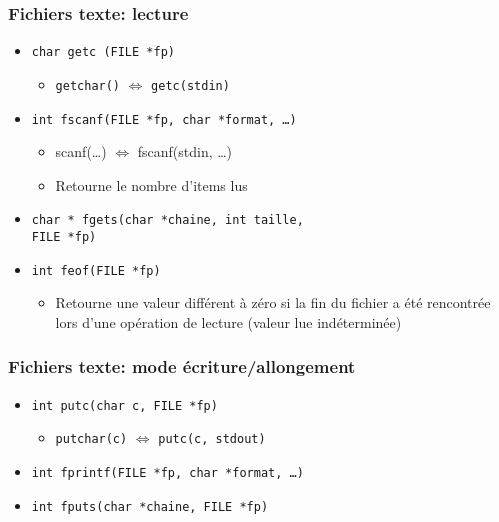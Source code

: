 \documentclass[table,handout,tikz,12pt,svgnames]{beamer}
\begin{document}
\begin{frame}[fragile=singleslide]
	\frametitle{Fichiers texte: lecture}
	\begin{block}{}
		\begin{itemize}

			\item \texttt{char getc (FILE *fp)}
			\begin{itemize}
				\item \texttt{getchar()} $\Leftrightarrow$ \texttt{getc(stdin)}
			\end{itemize}

			\item \texttt{int fscanf(FILE *fp, char *format, \ldots)}
			\begin{itemize}
				\item scanf(\ldots) $\Leftrightarrow$ fscanf(stdin, \ldots)
				\item Retourne le nombre d'items lus
			\end{itemize}
			
			\item \texttt{char * fgets(char *chaine, int taille,} \\
			\hspace{7em} \texttt{FILE *fp)}
			\item \texttt{int feof(FILE *fp)}
			\begin{itemize}
				\item Retourne une valeur différent à zéro si la fin du fichier a été rencontrée lors d'une opération de lecture (valeur lue indéterminée)
			\end{itemize}
			
		\end{itemize}
	\end{block}
\end{frame}


\begin{frame}[fragile=singleslide]
	\frametitle{Fichiers texte: mode écriture/allongement}
	\begin{block}{}
		\begin{itemize}
			\item \texttt{int putc(char c, FILE *fp)}
			\begin{itemize}
				\item \texttt{putchar(c)} $\Leftrightarrow$ \texttt{putc(c, stdout)}
			\end{itemize}
			\item \texttt{int fprintf(FILE *fp, char *format, \ldots)}
			\item \texttt{int fputs(char *chaine, FILE *fp)}
		\end{itemize}
	\end{block}
\end{frame}
\end{document}
